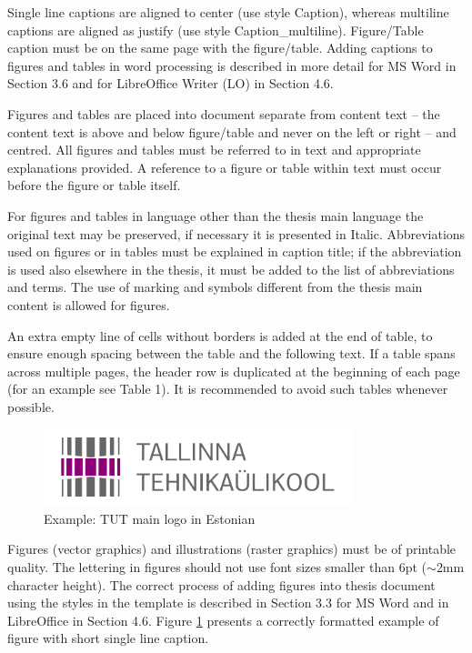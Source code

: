 Single line captions are aligned to center (use style Caption), whereas multiline captions are aligned as justify (use style Caption\_multiline). Figure/Table caption must be on the same page with the figure/table. Adding captions to figures and tables in word processing is described in more detail for MS Word in Section 3.6 and for LibreOffice Writer (LO)
in Section 4.6.

Figures and tables are placed into document separate from content text -- the content text is above and below figure/table and never on the left or right -- and centred. All figures and tables must be referred to in text and appropriate explanations provided. A reference to a figure or table within text must occur before the figure or table itself.

For figures and tables in language other than the thesis main language the original text may be preserved, if necessary it is presented in Italic. Abbreviations used on figures or in tables must be explained in caption title; if the abbreviation is used also elsewhere in the thesis, it must be added to the list of abbreviations and terms. The use of marking and symbols different from the thesis main content is allowed for figures.


An extra empty line of cells without borders is added at the end of table, to ensure enough spacing between the table and the following text. If a table spans across multiple pages,
the header row is duplicated at the beginning of each page (for an example see Table 1). It is recommended to avoid such tables whenever possible.

\begin{figure}[!ht]
\centering
\includegraphics[width=0.8\textwidth]{figures/TTU_peamine_logo_EST_print}
\caption{ Example: TUT main logo in Estonian}
\label{fig:logo}
\end{figure}

Figures (vector graphics) and illustrations (raster graphics) must be of printable quality. The lettering in figures should not use font sizes smaller than 6pt ($\sim$2mm character
height). The correct process of adding figures into thesis document using the styles in the template is described in Section 3.3 for MS Word and in LibreOffice in Section 4.6.
Figure \ref{fig:logo} presents a correctly formatted example of figure with short single line caption.

